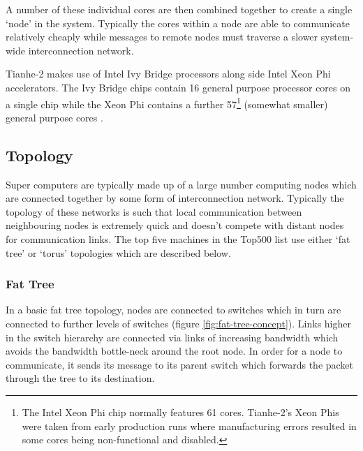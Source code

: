 			A number of these individual cores are then combined together to create a
			single `node' in the system. Typically the cores within a node are able to
			communicate relatively cheaply while messages to remote nodes must
			traverse a slower system-wide interconnection network.
			
			Tianhe-2 makes use of Intel Ivy Bridge processors along side Intel Xeon
			Phi accelerators. The Ivy Bridge chips contain 16 general purpose
			processor cores on a single chip while the Xeon Phi contains a further
			57\footnote{The Intel Xeon Phi chip normally features 61 cores. Tianhe-2's
			Xeon Phis were taken from early production runs where manufacturing errors
			resulted in some cores being non-functional and disabled.} (somewhat
			smaller) general purpose cores \cite{dongarra13}.
			
		
		\subsection{Topology}
			
			
			Super computers are typically made up of a large number computing nodes
			which are connected together by some form of interconnection network.
			Typically the topology of these networks is such that local communication
			between neighbouring nodes is extremely quick and doesn't compete with
			distant nodes for communication links. The top five machines in the
			Top500 list use either `fat tree' or `torus' topologies which are
			described below.
			
			\subsubsection{Fat Tree}
			
				In a basic fat tree topology, nodes are connected to switches which in
				turn are connected to further levels of switches (figure
				\ref{fig:fat-tree-concept}). Links higher in the switch hierarchy are
				connected via links of increasing bandwidth which avoids the bandwidth
				bottle-neck around the root node. In order for a node to communicate, it
				sends its message to its parent switch which forwards the packet through
				the tree to its destination.
				
